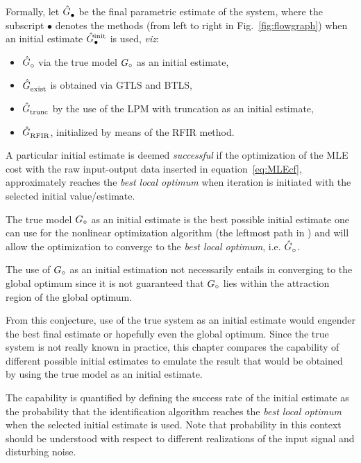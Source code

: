 Formally, let $\model{\bullet}$ be the final parametric estimate of the system, where the subscript $\bullet$ denotes the methods (from left to right in Fig.~\ref{fig:flowgraph}) when an initial estimate $\model[init]{\bullet}$ is used, \emph{viz}:
\begin{itemize}
    \item $\model{\trueSymbol}$ via the true model $\true{G}$ as an initial estimate,
    \item $\model{exist}$ is obtained via GTLS and BTLS,
    \item $\model{trunc}$ by the use of the LPM with truncation as an initial estimate,
    \item $\model{RFIR}$, initialized by means of the RFIR method. 
\end{itemize} 

A particular initial estimate is deemed \emph{successful} if the optimization of the MLE cost with the raw input-output data inserted in equation~\eqref{eq:MLEcf}, approximately reaches the \emph{best local optimum} when iteration is initiated with the selected initial value/estimate.

\begin{conjecture}\label{conj1}
The true model $\true{G}$ as an initial estimate is the best possible initial estimate one can use for the nonlinear optimization algorithm (the leftmost path in ) and will allow the optimization to converge to the \emph{best local optimum}, i.e. $\model{\trueSymbol}$.
\end{conjecture}
\begin{remark}
The use of $\true{G}$ as an initial estimation not necessarily entails in converging to the global optimum since it is not guaranteed that $\true{G}$ lies within the attraction region of the global optimum.
\end{remark}

From this conjecture, use of the true system as an initial estimate would engender the best final estimate or hopefully even the global optimum.
Since the true system is not really known in practice, this chapter compares the capability of different possible initial estimates to emulate the result that would be obtained by using the true model as an initial estimate. 

The capability is quantified by defining the success rate of the initial estimate as the probability that the identification algorithm reaches the \emph{best local optimum} when the selected initial estimate is used. 
Note that probability in this context should be understood with respect to different realizations of the input signal and disturbing noise.

